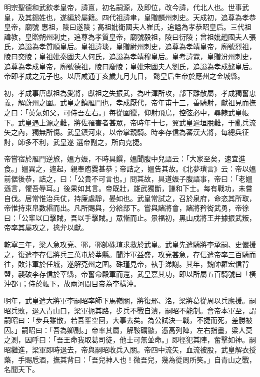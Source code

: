 
\begin{pinyinscope}

 明宗聖德和武欽孝皇帝，諱亶，初名嗣源，及即位，改今諱，代北人也。世事武皇，及其錫姓也，遂編於屬籍。四代祖諱聿，皇贈麟州刺史。天成初，追尊為孝恭皇帝，廟號
 惠祖，陵曰遂陵；高祖妣衛國夫人崔氏，追謚為孝恭昭皇后。三代祖諱教，皇贈朔州刺史，追尊為孝質皇帝，廟號毅祖，陵曰衍陵；曾祖妣趙國夫人張氏，追謚為孝質順皇后。皇祖諱琰，皇贈尉州刺史，追尊為孝靖皇帝，廟號烈祖，陵曰奕陵；皇祖妣秦國夫人何氏，追謚為孝靖穆皇后。皇考諱霓，皇贈汾州刺史，追尊為孝成皇帝，廟號德祖，陵曰慶陵；皇妣宋國夫人劉氏，追謚為孝成懿皇后。帝即孝成之元子也。以唐咸通丁亥歲九月九日，
 懿皇后生帝於應州之金城縣。



 初，孝成事唐獻祖為愛將，獻祖之失振武，為吐渾所攻，部下離散屬，孝成獨奮忠義，解蔚州之圍。武皇之鎮雁門也，孝成厭代，帝年甫十三，善騎射，獻祖見而撫之曰：「英氣如父，可侍吾左右。」每從圍獵，仰射飛鳥，控弦必中，尋隸武皇帳下。武皇遇上源之難，將佐罹害者甚眾，帝時年十七，翼武皇逾垣脫難，于亂兵流矢之內，獨無所傷。武皇鎮河東，以帝掌親騎。時李存信為蕃漢大將，每總兵征討，師多不利，武皇遂
 選帝副之，所向克捷。



 帝嘗宿於雁門逆旅，媼方娠，不時具饌，媼聞腹中兒語云：「大家至矣，速宜進食。」媼異之，遽起，親奉庖爨甚恭；帝詰之，媼告其故。《北夢瑣言》云：帝以媼前倨後恭，詰之，曰：「公貴不可言也。」問其故，具道娠子腹語事，帝曰：「老媼遜言，懼吾辱耳。」後果如其言。帝既壯，雄武獨斷，謙和下士。每有戰功，未嘗自伐。居常惟治兵仗，持廉處靜，晏如也。武皇常試之，召於泉府，命恣其所取，帝惟持束帛數緡而出。凡所賜與，分給部下。嘗與諸將會，諸將矜衒武勇，帝徐曰：「公輩以口擊賊，吾以手擊賊。」眾慚而止。景福初，黑山戍將王弁據振武叛，帝率其屬攻之，擒弁以獻。



 乾寧三年，梁人急攻兗、鄆，鄆帥硃瑄求救於武皇。武皇先遣騎將李承嗣、史儼援之，復遣李存信將兵三萬屯於莘縣。聞汴軍益盛，攻兗甚急，存信遣帝率三百騎而往，敗汴軍於任城，遂解兗州之圍。硃瑾見帝，執手涕謝。其年，魏帥羅宏信背盟，襲破李存信於莘縣，帝奮命殿軍而還，武皇嘉其功，即以所屬五百騎號曰「橫沖都」；侍於帳下，故兩河間目帝為李橫沖。



 明年，武皇遣大將軍李嗣昭率師下馬嶺關，將復邢、洺，梁將葛從周以兵應援。嗣昭兵敗，退入青山口，梁軍扼其路，步兵不戰自潰，嗣昭不能制。會帝本軍至，謂嗣昭曰：「步兵雖散，若吾輩空回，大事去矣。為公試決一戰，不捷而死，差勝被囚。」嗣昭曰：「吾為卿副。」帝率其屬，解鞍礪鏃，憑高列陣，左右指畫，梁人莫之測，因呼曰：「吾王命我取葛司徒，他士可無並命。」即徑犯其陣，奮擊如神。嗣昭繼進，梁軍即時退去，帝與嗣昭收兵入關。帝四中流矢，血流被股，武皇解衣授藥，手賜卮酒，撫其背曰：「吾兒神人也！微吾兒，幾為從周所笑。」自青山之戰，名聞天下。




\end{pinyinscope}

